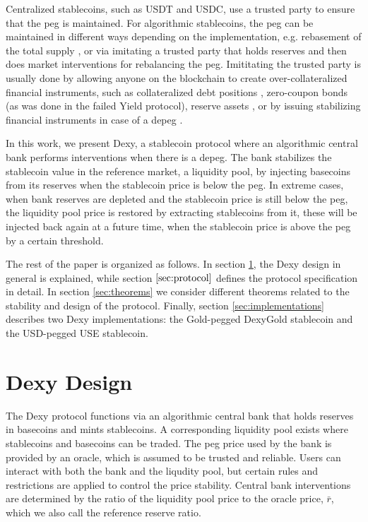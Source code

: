 \documentclass{ifcolog}
\newcommand{\rr}{\bar{r}}
\newcommand{\dx}{Dexy}
\begin{document}
Centralized stablecoins, such as USDT and USDC, use a trusted party to ensure that the peg is maintained. For algorithmic stablecoins, 
the peg can be maintained in different ways depending on the implementation, e.g. rebasement of the total supply \cite{Ampleforth}, 
or via imitating a trusted party that holds reserves and then does market interventions for rebalancing the peg. 
Imititating the trusted party is usually done by allowing anyone on the blockchain to create over-collateralized financial instruments, 
such as collateralized debt positions \cite{DAI}, zero-coupon bonds (as was done in the failed Yield protocol), 
reserve assets \cite{DjedEprint,Gluon}, or by issuing stabilizing financial instruments in case of a depeg \cite{Neutrino}.

In this work, we present \dx{}, a stablecoin protocol where an algorithmic central bank performs interventions when there is a depeg.
The bank stabilizes the stablecoin value in the reference market, a liquidity pool, by injecting basecoins from its reserves when the 
stablecoin price is below the peg. In extreme cases, when bank reserves are depleted and the stablecoin price is still below the peg, 
the liquidity pool price is restored by extracting stablecoins from it, these will be injected back again at a future time, 
when the stablecoin price is above the peg by a certain threshold. 

The rest of the paper is organized as follows. In section \ref{sec:design}, the \dx{} design in general is explained, while 
section $\ref{sec:protocol}$ defines the protocol specification in detail.
In section \ref{sec:theorems} we consider different theorems related to the stability and design of the protocol.
Finally, section \ref{sec:implementations} describes two \dx{} implementations: the Gold-pegged DexyGold stablecoin and the USD-pegged USE stablecoin.

\section{\dx{} Design}
\label{sec:design}

The \dx{} protocol functions via an algorithmic central bank that holds reserves in basecoins and mints stablecoins. 
A corresponding liquidity pool exists where stablecoins and basecoins can be traded. 
The peg price used by the bank is provided by an oracle, which is assumed to be trusted and reliable. 
Users can interact with both the bank and the liqudity pool, but certain rules and restrictions are applied to control 
the price stability. Central bank interventions are determined by the ratio of the liquidity pool price to the oracle price, $\rr$, 
which we also call the reference reserve ratio. 
\end{document}
